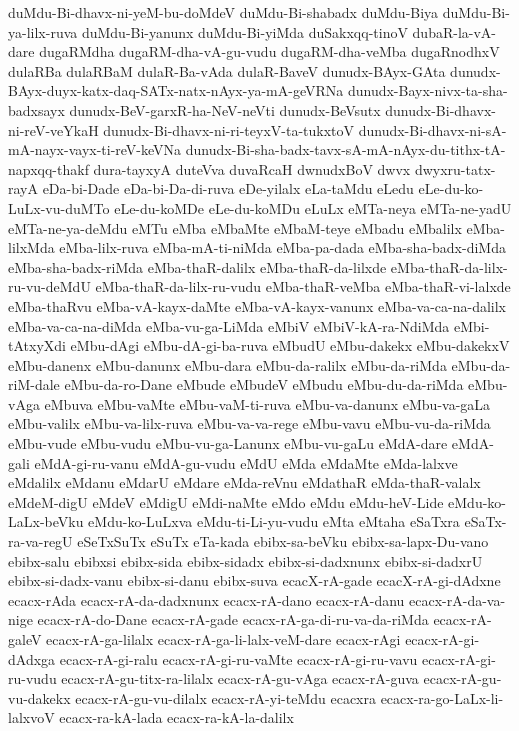 {duMdu-Bi-dhavx-ni-yeM-bu-doMdeV
duMdu-Bi-shabadx
duMdu-Biya
duMdu-Bi-ya-lilx-ruva
duMdu-Bi-yanunx
duMdu-Bi-yiMda
duSakxqq-tinoV
dubaR-la-vA-dare
dugaRMdha
dugaRM-dha-vA-gu-vudu
dugaRM-dha-veMba
dugaRnodhxV
dulaRBa
dulaRBaM
dulaR-Ba-vAda
dulaR-BaveV
dunudx-BAyx-GAta
dunudx-BAyx-duyx-katx-daq-SATx-natx-nAyx-ya-mA-geVRNa
dunudx-Bayx-nivx-ta-sha-badxsayx
dunudx-BeV-garxR-ha-NeV-neVti
dunudx-BeVsutx
dunudx-Bi-dhavx-ni-reV-veYkaH
dunudx-Bi-dhavx-ni-ri-teyxV-ta-tukxtoV
dunudx-Bi-dhavx-ni-sA-mA-nayx-vayx-ti-reV-keVNa
dunudx-Bi-sha-badx-tavx-sA-mA-nAyx-du-tithx-tA-napxqq-thakf
dura-tayxyA
duteVva
duvaRcaH
dwnudxBoV
dwvx
dwyxru-tatx-rayA
eDa-bi-Dade
eDa-bi-Da-di-ruva
eDe-yilalx
eLa-taMdu
eLedu
eLe-du-ko-LuLx-vu-duMTo
eLe-du-koMDe
eLe-du-koMDu
eLuLx
eMTa-neya
eMTa-ne-yadU
eMTa-ne-ya-deMdu
eMTu
eMba
eMbaMte
eMbaM-teye
eMbadu
eMbalilx
eMba-lilxMda
eMba-lilx-ruva
eMba-mA-ti-niMda
eMba-pa-dada
eMba-sha-badx-diMda
eMba-sha-badx-riMda
eMba-thaR-dalilx
eMba-thaR-da-lilxde
eMba-thaR-da-lilx-ru-vu-deMdU
eMba-thaR-da-lilx-ru-vudu
eMba-thaR-veMba
eMba-thaR-vi-lalxde
eMba-thaRvu
eMba-vA-kayx-daMte
eMba-vA-kayx-vanunx
eMba-va-ca-na-dalilx
eMba-va-ca-na-diMda
eMba-vu-ga-LiMda
eMbiV
eMbiV-kA-ra-NdiMda
eMbi-tAtxyXdi
eMbu-dAgi
eMbu-dA-gi-ba-ruva
eMbudU
eMbu-dakekx
eMbu-dakekxV
eMbu-danenx
eMbu-danunx
eMbu-dara
eMbu-da-ralilx
eMbu-da-riMda
eMbu-da-riM-dale
eMbu-da-ro-Dane
eMbude
eMbudeV
eMbudu
eMbu-du-da-riMda
eMbu-vAga
eMbuva
eMbu-vaMte
eMbu-vaM-ti-ruva
eMbu-va-danunx
eMbu-va-gaLa
eMbu-valilx
eMbu-va-lilx-ruva
eMbu-va-va-rege
eMbu-vavu
eMbu-vu-da-riMda
eMbu-vude
eMbu-vudu
eMbu-vu-ga-Lanunx
eMbu-vu-gaLu
eMdA-dare
eMdA-gali
eMdA-gi-ru-vanu
eMdA-gu-vudu
eMdU
eMda
eMdaMte
eMda-lalxve
eMdalilx
eMdanu
eMdarU
eMdare
eMda-reVnu
eMdathaR
eMda-thaR-valalx
eMdeM-digU
eMdeV
eMdigU
eMdi-naMte
eMdo
eMdu
eMdu-heV-Lide
eMdu-ko-LaLx-beVku
eMdu-ko-LuLxva
eMdu-ti-Li-yu-vudu
eMta
eMtaha
eSaTxra
eSaTx-ra-va-regU
eSeTxSuTx
eSuTx
eTa-kada
ebibx-sa-beVku
ebibx-sa-lapx-Du-vano
ebibx-salu
ebibxsi
ebibx-sida
ebibx-sidadx
ebibx-si-dadxnunx
ebibx-si-dadxrU
ebibx-si-dadx-vanu
ebibx-si-danu
ebibx-suva
ecacX-rA-gade
ecacX-rA-gi-dAdxne
ecacx-rAda
ecacx-rA-da-dadxnunx
ecacx-rA-dano
ecacx-rA-danu
ecacx-rA-da-va-nige
ecacx-rA-do-Dane
ecacx-rA-gade
ecacx-rA-ga-di-ru-va-da-riMda
ecacx-rA-galeV
ecacx-rA-ga-lilalx
ecacx-rA-ga-li-lalx-veM-dare
ecacx-rAgi
ecacx-rA-gi-dAdxga
ecacx-rA-gi-ralu
ecacx-rA-gi-ru-vaMte
ecacx-rA-gi-ru-vavu
ecacx-rA-gi-ru-vudu
ecacx-rA-gu-titx-ra-lilalx
ecacx-rA-gu-vAga
ecacx-rA-guva
ecacx-rA-gu-vu-dakekx
ecacx-rA-gu-vu-dilalx
ecacx-rA-yi-teMdu
ecacxra
ecacx-ra-go-LaLx-li-lalxvoV
ecacx-ra-kA-lada
ecacx-ra-kA-la-dalilx
}
